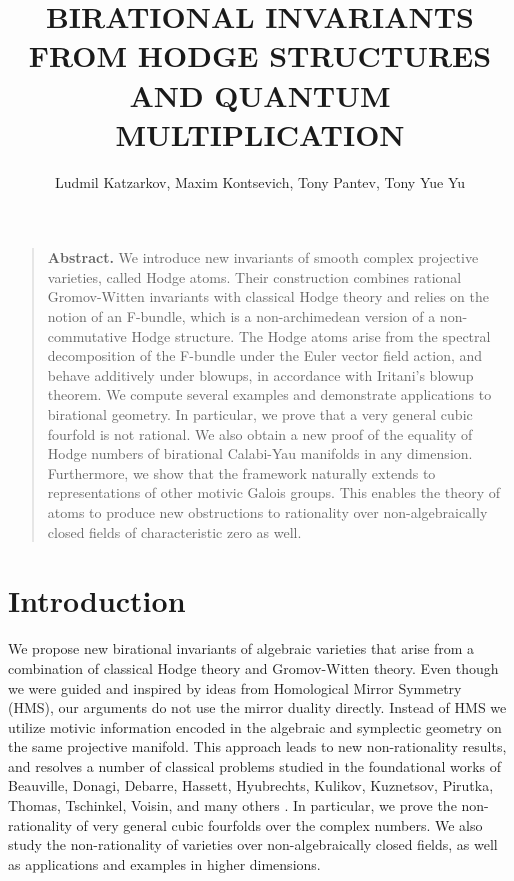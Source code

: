 \documentclass[twoside,leqno]{article}
\title{\large\bfseries \uppercase{Birational Invariants from Hodge Structures  \\ 
and Quantum Multiplication}}
\author{Ludmil Katzarkov, Maxim Kontsevich, Tony Pantev, Tony Yue Yu}
\date{}
\newcommand\blfootnote[1]{%
	\begingroup
	\renewcommand\thefootnote{}\footnote{#1}%
	\addtocounter{footnote}{-1}%
	\endgroup
}
\numberwithin{equation}{section}
\theoremstyle{plain}
\theoremstyle{definition}
\begin{document}
\maketitle






\begin{quotation}
\small
\textbf{Abstract. }
We introduce new invariants of smooth complex projective varieties, called Hodge atoms. Their construction combines rational Gromov-Witten invariants with classical Hodge theory and relies on the notion of an F-bundle, which is a non-archimedean version of a non-commutative Hodge structure. The Hodge atoms arise from the spectral decomposition of the F-bundle under the Euler vector field action, and behave additively under blowups, in accordance with Iritani's blowup theorem. We compute several examples and demonstrate applications to birational geometry. In particular, we prove that a very general cubic fourfold is not rational. 
We also obtain a new proof of the equality of Hodge numbers of birational Calabi-Yau manifolds in any dimension.
Furthermore, we show that the framework naturally extends to representations of other motivic Galois groups. This enables the theory of atoms to produce new obstructions to rationality over non-algebraically closed fields of characteristic zero as well.
\end{quotation}

\tableofcontents

\section{Introduction}

We propose new birational invariants of algebraic
varieties that arise from a combination of classical Hodge theory and
Gromov-Witten theory. Even though we were guided and inspired by ideas
from Homological Mirror Symmetry (HMS), our arguments do not use the
mirror duality directly. Instead of HMS we utilize motivic information
encoded in the algebraic and symplectic geometry on the same
projective manifold.  This approach leads to new non-rationality
results, and resolves a number of classical problems studied in the
foundational works of Beauville,
Donagi,
Debarre, Hassett, Hyubrechts, Kulikov,
Kuznetsov, Pirutka, Thomas, Tschinkel, Voisin, and many others
\cite{Beauville-quadrics,Beauville-Donagi,DK-GM,DK-GMIJ,debarre-GM,
Hassett-cubic4fold,Hassett-survey,HPT-qb,HPT-ds,HPT-threeq,
Huybrechts-survey,Hyubrechts-K3cubic,
kulikov-cubic4fold,Kuznetsov-cubic4fold,Kuznetsov-derived,KP-Mukai,
KP-Fano3nc,Pirutka-0cycles,ABP-qb,AT,
Voisin-unirational,Voisin-decomposition,Voisin-stable,Voisin-integral}.
In particular, we prove the non-rationality of very general
cubic fourfolds over the complex numbers.
We also study the non-rationality of varieties over non-algebraically closed fields, as well as applications and examples in higher dimensions.
\end{document}
